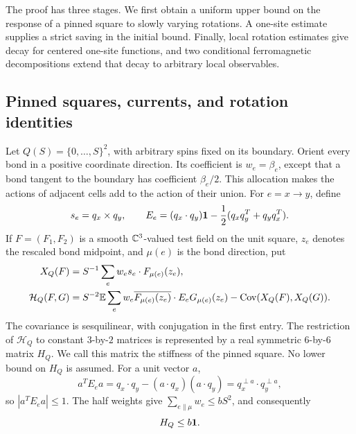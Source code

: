 The proof has three stages. We first obtain a uniform upper bound on the
response of a pinned square to slowly varying rotations. A one-site
estimate supplies a strict saving in the initial bound. Finally, local
rotation estimates give decay for centered one-site functions, and two
conditional ferromagnetic decompositions extend that decay to arbitrary
local observables.

\subsection{Pinned squares, currents, and rotation identities}

Let $Q(S)=\{0,\ldots,S\}^2$, with arbitrary spins fixed on its boundary.
Orient every bond in a positive coordinate direction. Its coefficient is
$w_e=\beta_e$, except that a bond tangent to the boundary has coefficient
$\beta_e/2$. This allocation makes the actions of adjacent cells add to
the action of their union. For $e=x\to y$, define
\begin{equation}
 s_e=q_x\times q_y,\qquad
 E_e=(q_x\cdot q_y)\mathbf 1-\frac12(q_xq_y^T+q_yq_x^T).
 \label{eq:prelim-contact}
\end{equation}
If $F=(F_1,F_2)$ is a smooth $\mathbb C^3$-valued test field on the unit square,
$z_e$ denotes the rescaled bond midpoint, and $\mu(e)$ is the bond
direction, put
\begin{align}
 X_Q(F)&=S^{-1}\sum_e w_es_e\cdot F_{\mu(e)}(z_e),
 \label{eq:prelim-current}\\
 \mathcal H_Q(F,G)&=
 S^{-2}\mathbb E\sum_e w_e\overline{F_{\mu(e)}(z_e)}\cdot
 E_eG_{\mu(e)}(z_e)-\operatorname{Cov}(X_Q(F),X_Q(G)).
 \label{eq:prelim-stiffness}
\end{align}
The covariance is sesquilinear, with conjugation in the first entry.
The restriction of $\mathcal H_Q$ to constant $3$-by-$2$ matrices is
represented by a real symmetric $6$-by-$6$ matrix $H_Q$. We call this
matrix the stiffness of the pinned square. No lower bound on $H_Q$ is
assumed. For a unit vector $a$,
\[
 a^TE_ea=q_x\cdot q_y-(a\cdot q_x)(a\cdot q_y)
 =q_x^{\perp a}\cdot q_y^{\perp a},
\]
so $|a^TE_ea|\le1$. The half weights give
$\sum_{e\parallel\mu}w_e\le bS^2$, and consequently
\begin{equation}
 H_Q\le b\mathbf 1.
 \label{eq:prelim-initial-stiffness}
\end{equation}

